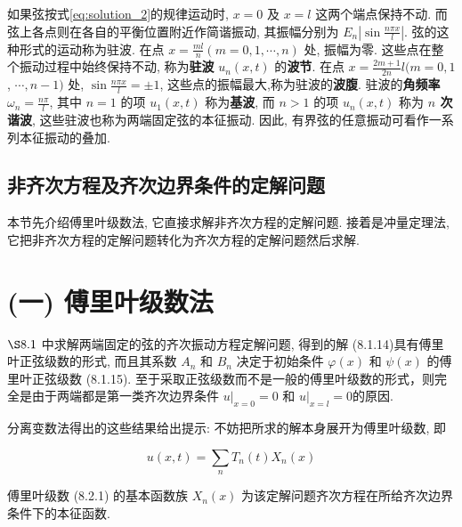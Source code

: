 \begin{enumerate}
        如果弦按式\eqref{eq:solution_2}的规律运动时, 
        $x=0$ 及 $x=l$ 这两个端点保持不动. 
        而弦上各点则在各自的平衡位置附近作简谐振动, 
        其振幅分别为 $E_{n}\left|\sin \frac{n \pi x}{l}\right|$. 
        弦的这种形式的运动称为驻波. 
        在点 $x=\frac{m l}{n}(m=0,1, \cdots, n)$ 处, 振幅为零. 
        这些点在整个振动过程中始终保持不动, 称为\textbf{驻波} $u_{n}(x, t)$ 的\textbf{波节}. 
        在点 $x=\frac{2 m+1}{2 n} l(m=0,1$, $\cdots, n-1)$ 处, 
        $\sin \frac{n \pi x}{l}= \pm 1$, 这些点的振幅最大,称为驻波的\textbf{波腹}.
         驻波的\textbf{角频率} $\omega_{n}=\frac{n \pi}{l}$, 
         其中 $n=1$ 的项 $u_{1}(x, t)$ 称为\textbf{基波}, 
         而 $n>1$ 的项 $u_{n}(x, t)$ 称为 \textbf{$n$ 次谐波}, 
         这些驻波也称为两端固定弦的本征振动. 
         因此, 有界弦的任意振动可看作一系列本征振动的叠加.
        
\end{enumerate}





\subsection{非齐次方程及齐次边界条件的定解问题}



本节先介绍傅里叶级数法, 它直接求解非齐次方程的定解问题. 
接着是冲量定理法, 它把非齐次方程的定解问题转化为齐次方程的定解问题然后求解.

\section{(一) 傅里叶级数法}
$\S 8.1$ 中求解两端固定的弦的齐次振动方程定解问题, 得到的解 (8.1.14)具有傅里叶正弦级数的形式, 而且其系数 $A_{n}$ 和 $B_{n}$ 决定于初始条件 $\varphi(x)$ 和 $\psi(x)$ 的傅里叶正弦级数 (8.1.15). 至于采取正弦级数而不是一般的傅里叶级数的形式，则完全是由于两端都是第一类齐次边界条件 $\left.u\right|_{x=0}=0$ 和 $\left.u\right|_{x=l}=0$的原因.

分离变数法得出的这些结果给出提示: 不妨把所求的解本身展开为傅里叶级数, 即

$$
u(x, t)=\sum_{n} T_{n}(t) X_{n}(x)
$$

傅里叶级数 (8.2.1) 的基本函数族 $X_{n}(x)$ 为该定解问题齐次方程在所给齐次边界条件下的本征函数.

